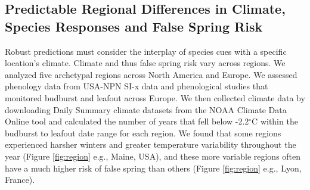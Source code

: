\documentclass{article}\usepackage[]{graphicx}\usepackage[]{color}
\begin{document}

\subsection* {Predictable Regional Differences in Climate, Species Responses and False Spring Risk}
Robust predictions must consider the interplay of species cues with a specific location's climate. Climate and thus false spring risk vary across regions. We analyzed five archetypal regions across North America and Europe. We assessed phenology data from USA-NPN SI-x data and phenological studies that monitored budburst and leafout across Europe. We then collected climate data by downloading Daily Summary climate datasets from the NOAA Climate Data Online tool \citep{NOAA} and calculated the number of years that fell below -2.2$^{\circ}$C within the budburst to leafout date range for each region. We found that some regions experienced harsher winters and greater temperature variability throughout the year (Figure \ref{fig:region} e.g., Maine, USA), and these more variable regions often have a much higher risk of false spring than others (Figure \ref{fig:region} e.g., Lyon, France). 
\end{document}
